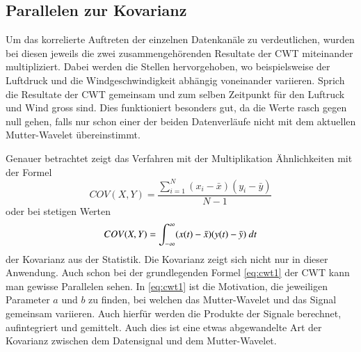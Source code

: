 \begin{refsection}
\subsection{Parallelen zur Kovarianz}
Um das korrelierte Auftreten der einzelnen Datenkanäle zu verdeutlichen, wurden bei diesen jeweils die zwei zusammengehörenden Resultate der CWT miteinander multipliziert. 
Dabei werden die Stellen hervorgehoben, wo beispielsweise der Luftdruck und die Windgeschwindigkeit abhängig voneinander variieren. 
Sprich die Resultate der CWT gemeinsam und zum selben Zeitpunkt für den Luftruck und Wind gross sind.
Dies funktioniert besonders gut, da die Werte rasch gegen null gehen, falls nur schon einer der beiden Datenverläufe nicht mit dem aktuellen Mutter-Wavelet übereinstimmt.


Genauer betrachtet zeigt das Verfahren mit der Multiplikation Ähnlichkeiten mit der Formel
\begin{equation}
COV(X,Y) = \frac{\sum_{i=1}^{N} (x_i- \bar{x})(y_i- \bar{y})}{N-1}
\label{eq:kovarianz}
\end{equation}
oder bei stetigen Werten
\begin{equation}
COV(X,Y) = \int_{-\infty}^\infty (x(t)- \bar{x})(y(t)- \bar{y}) \text{\space}dt
\label{eq:kovarianz_int}
\end{equation}
der Kovarianz aus der Statistik. 
%
Die Kovarianz zeigt sich nicht nur in dieser Anwendung. Auch schon bei der grundlegenden Formel \eqref{eq:cwt1} der CWT kann man gewisse Parallelen sehen. 
In \eqref{eq:cwt1} ist die Motivation, die jeweiligen Parameter $a$ und $b$ zu finden, bei welchen das Mutter-Wavelet und das Signal gemeinsam variieren.
Auch hierfür werden die Produkte der Signale berechnet, aufintegriert und gemittelt.
Auch dies ist eine etwas abgewandelte Art der Kovarianz zwischen dem Datensignal und dem Mutter-Wavelet.


\end{refsection}
